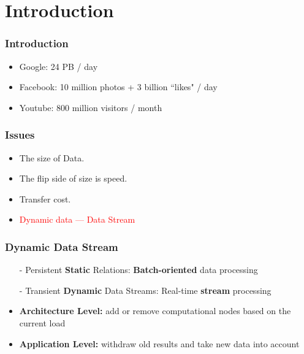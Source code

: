 
\setlength{\parskip}{\baselineskip} 
\section{Introduction}
\begin{comment}
\begin{frame}[t]
\frametitle{Introduction}
    \begin{center}
    	\includegraphics<1>[width=1\textwidth]{figs/background.jpg}
    \end{center}
\end{frame}
\end{comment}

\begin{frame}
\frametitle{Introduction}
\begin{itemize}
\item Google: 24 PB / day

\item Facebook: 10 million photos + 3 billion ``likes" / day

\item Youtube: 800 million visitors / month

\end{itemize}
\end{frame}

\begin{frame}
\frametitle{Issues}
\begin{itemize}
\item The size of Data.

\item The flip side of size is speed.

\item Transfer cost.

\item \textcolor{red}{Dynamic data --- Data Stream}
\end{itemize}
\end{frame}

\begin{frame}
\frametitle{Dynamic Data Stream}

\begin{itemize}
\item[-] Persistent \textbf{Static} Relations: \textbf{Batch-oriented} data processing


\item[-] Transient \textbf{Dynamic} Data Streams: Real-time \textbf{stream} processing
\end{itemize}


\begin{itemize}
\item \textbf{Architecture Level: } add or remove computational nodes based on the current load

\item \textbf{Application Level: } withdraw old results and take new data into account
\end{itemize}
\end{frame}


